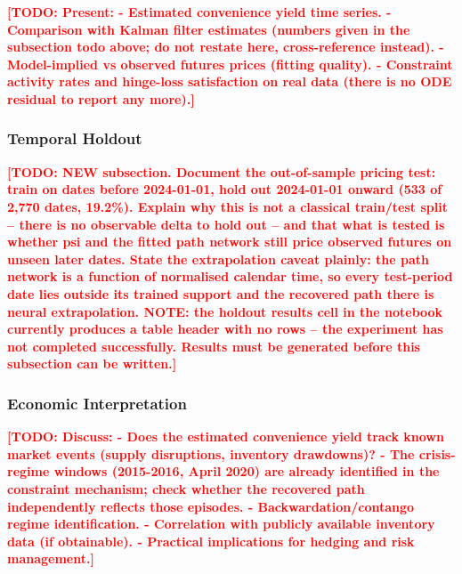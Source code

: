 \documentclass[11pt, a4paper]{article}
\newcommand{\todo}[1]{\textcolor{red}{\textbf{[TODO: #1]}}}
\begin{document}
\todo{Present:
  - Estimated convenience yield time series.
  - Comparison with Kalman filter estimates (numbers given in the subsection
    todo above; do not restate here, cross-reference instead).
  - Model-implied vs observed futures prices (fitting quality).
  - Constraint activity rates and hinge-loss satisfaction on real data (there is
    no ODE residual to report any more).}

\subsubsection{Temporal Holdout}
\label{sec:holdout}

\todo{NEW subsection. Document the out-of-sample pricing test: train on dates
  before 2024-01-01, hold out 2024-01-01 onward (533 of 2,770 dates, 19.2\%).
  Explain why this is not a classical train/test split -- there is no observable
  delta to hold out -- and that what is tested is whether psi and the fitted path
  network still price observed futures on unseen later dates.
  State the extrapolation caveat plainly: the path network is a function of
  normalised calendar time, so every test-period date lies outside its trained
  support and the recovered path there is neural extrapolation.
  NOTE: the holdout results cell in the notebook currently produces a table
  header with no rows -- the experiment has not completed successfully. Results
  must be generated before this subsection can be written.}

\subsubsection{Economic Interpretation}
\label{sec:economic_interp}

\todo{Discuss:
  - Does the estimated convenience yield track known market events
    (supply disruptions, inventory drawdowns)?
  - The crisis-regime windows (2015-2016, April 2020) are already identified in
    the constraint mechanism; check whether the recovered path independently
    reflects those episodes.
  - Backwardation/contango regime identification.
  - Correlation with publicly available inventory data (if obtainable).
  - Practical implications for hedging and risk management.}

\end{document}
